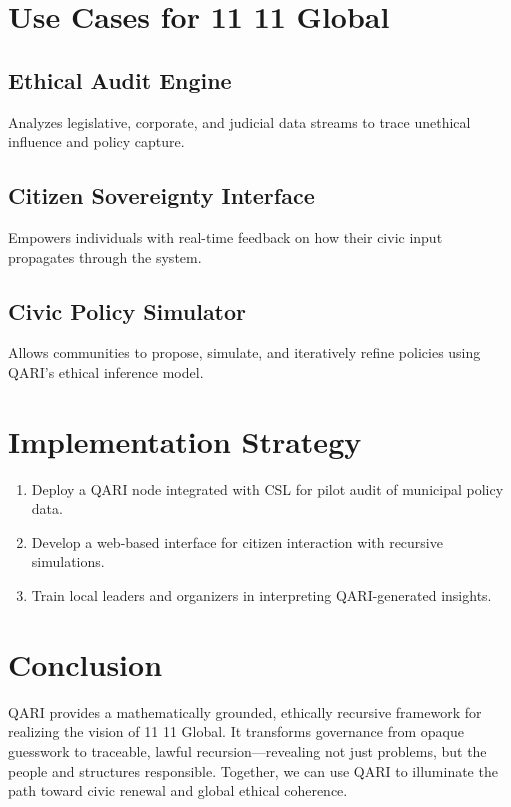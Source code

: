 \documentclass[12pt]{article}
\begin{document}
\section{Use Cases for 11 11 Global}
\subsection{Ethical Audit Engine}
Analyzes legislative, corporate, and judicial data streams to trace unethical influence and policy capture.

\subsection{Citizen Sovereignty Interface}
Empowers individuals with real-time feedback on how their civic input propagates through the system.

\subsection{Civic Policy Simulator}
Allows communities to propose, simulate, and iteratively refine policies using QARI's ethical inference model.

\section{Implementation Strategy}
\begin{enumerate}[noitemsep]
    \item Deploy a QARI node integrated with CSL for pilot audit of municipal policy data.
    \item Develop a web-based interface for citizen interaction with recursive simulations.
    \item Train local leaders and organizers in interpreting QARI-generated insights.
\end{enumerate}

\section{Conclusion}
QARI provides a mathematically grounded, ethically recursive framework for realizing the vision of 11 11 Global. It transforms governance from opaque guesswork to traceable, lawful recursion—revealing not just problems, but the people and structures responsible. Together, we can use QARI to illuminate the path toward civic renewal and global ethical coherence.
\end{document}
